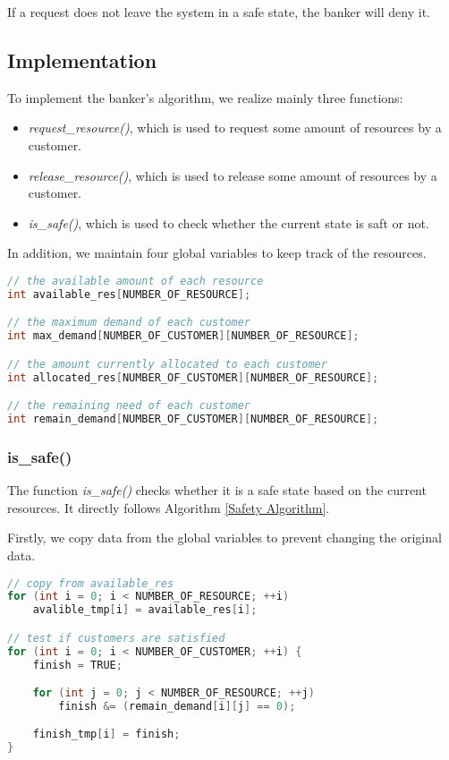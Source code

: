 \documentclass{article}
\begin{document}
If a request does not leave the system in a safe state, the banker will deny it.

\subsection*{Implementation}
To implement the banker's algorithm, we realize mainly three functions:

\begin{itemize}
    \item \textit{request\_resource()}, which is used to request some amount of resources by a customer.
    \item \textit{release\_resource()}, which is used to release some amount of resources by a customer.
    \item \textit{is\_safe()}, which is used to check whether the current state is saft or not.
\end{itemize}

In addition, we maintain four global variables to keep track of the resources.

\begin{lstlisting}[language=c, caption={Data Structures for Tracked Resources}]
// the available amount of each resource
int available_res[NUMBER_OF_RESOURCE];

// the maximum demand of each customer
int max_demand[NUMBER_OF_CUSTOMER][NUMBER_OF_RESOURCE];

// the amount currently allocated to each customer
int allocated_res[NUMBER_OF_CUSTOMER][NUMBER_OF_RESOURCE];

// the remaining need of each customer
int remain_demand[NUMBER_OF_CUSTOMER][NUMBER_OF_RESOURCE];
\end{lstlisting}

\subsubsection*{is\_safe()}
The function \textit{is\_safe()} checks whether it is a safe state based on the current resources. It directly follows Algorithm \ref{Safety Algorithm}.

Firstly, we copy data from the global variables to prevent changing the original data.

\begin{lstlisting}[language=c, caption={is\_safe() I}]
// copy from available_res
for (int i = 0; i < NUMBER_OF_RESOURCE; ++i) 
    avalible_tmp[i] = available_res[i];

// test if customers are satisfied
for (int i = 0; i < NUMBER_OF_CUSTOMER; ++i) {
    finish = TRUE;

    for (int j = 0; j < NUMBER_OF_RESOURCE; ++j)
        finish &= (remain_demand[i][j] == 0);

    finish_tmp[i] = finish;
}
\end{lstlisting}
\end{document}
